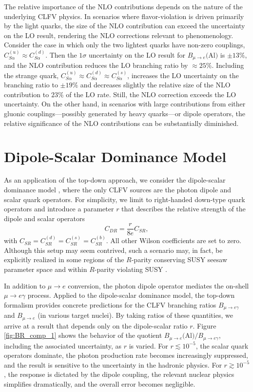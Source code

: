 \documentclass[12pt,letterpaper]{book}
\begin{document}
The relative importance of the NLO contributions depends on the nature of the underlying CLFV physics. In scenarios where flavor-violation is driven primarily by the light quarks, the size of the NLO contribution can exceed the uncertainty on the LO result, rendering the NLO corrections relevant to phenomenology. Consider the case in which only the two lightest quarks have non-zero couplings, $C^{(u)}_{S\alpha}\approx C^{(d)}_{S\alpha}$. Then the $1\sigma$ uncertainty on the LO result for $B_{\mu\rightarrow e}($Al$)$ is $\pm 13\%$, and the NLO contribution reduces the LO branching ratio by $\approx 25\%$. Including the strange quark, $C^{(u)}_{S\alpha}\approx C^{(d)}_{S\alpha}\approx C^{(s)}_{S\alpha}$, increases the LO uncertainty on the branching ratio to $\pm 19\%$ and decreases slightly the relative size of the NLO contribution to $23\%$ of the LO rate. Still, the NLO correction exceeds the LO uncertainty. On the other hand, in scenarios with large contributions from either gluonic couplings---possibly generated by heavy quarks---or dipole operators, the relative significance of the NLO contributions can be substantially diminished.
\section{Dipole-Scalar Dominance Model}
As an application of the top-down approach, we consider the dipole-scalar dominance model \cite{Cirigliano:2009bz}, where the only CLFV sources are the photon dipole and scalar quark operators. For simplicity, we limit to right-handed down-type quark operators and introduce a parameter $r$ that describes the relative strength of the dipole and scalar operators 
\begin{equation}
C_{DR}=\frac{r}{8e}C_{SR},
\end{equation} 
with $C_{SR}=C_{SR}^{(d)}=C_{SR}^{(s)}=C_{SR}^{(b)}$. All other Wilson coefficients are set to zero. Although this setup may seem contrived, such a scenario may, in fact, be explicitly realized in some regions of the $R$-parity conserving SUSY seesaw parameter space \cite{KITANO2003300} and within $R$-parity violating SUSY \cite{PhysRevD.56.100,HUITU1998355,FAESSLER200025}. 

In addition to $\mu\rightarrow e$ conversion, the photon dipole operator mediates the on-shell $\mu\rightarrow e\gamma$ process. Applied to the dipole-scalar dominance model, the top-down formalism provides concrete predictions for the CLFV branching ratios $B_{\mu\rightarrow e\gamma}$ and $B_{\mu\rightarrow e}$ (in various target nuclei). By taking ratios of these quantities, we arrive at a result that depends only on the dipole-scalar ratio $r$. Figure \ref{fig:BR_comp_1} shows the behavior of the quotient $B_{\mu\rightarrow e}($Al$)/B_{\mu\rightarrow e\gamma}$, including the associated uncertainty, as $r$ is varied. For $r\lesssim 10^{-5}$, the scalar quark operators dominate, the photon production rate becomes increasingly suppressed, and the result is sensitive to the uncertainty in the hadronic physics. For $r\gtrsim 10^{-5}$, the response is dictated by the dipole coupling, the relevant nuclear physics simplifies dramatically, and the overall error becomes negligible.
\end{document}
